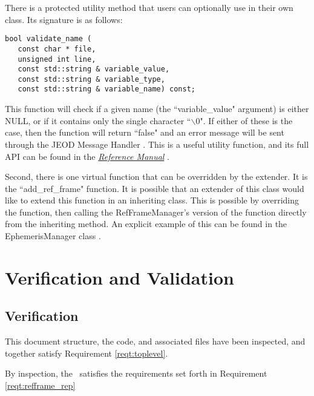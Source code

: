There is a protected utility method that users can optionally use in their own
class. Its signature is as follows:

\begin{verbatim}
bool validate_name (
   const char * file,
   unsigned int line,
   const std::string & variable_value,
   const std::string & variable_type,
   const std::string & variable_name) const;
\end{verbatim}

This function will check if a given name (the ``variable\_value" argument) is either NULL, or
if it contains only the single character ``$\backslash$0". If either of these is the case, then the function
will return ``false" and an error message will be sent through the
JEOD Message Handler \cite{dynenv:MESSAGE}. This is a useful utility function, and its full API
can be found in the \href{file:refman.pdf} {\em Reference Manual}
\cite{refframesbib:ReferenceManual}.

Second, there is one virtual function that can be overridden by the extender. It is the
``add\_ref\_frame" function. It is possible that an extender of this class would like
to extend this function in an inheriting class. This is possible by overriding the function,
then calling the RefFrameManager's version of the function directly from the inheriting method.
An explicit example of this can be found in the EphemerisManager class \cite{dynenv:EPHEMERIDES}.


\chapter{Verification and Validation}\label{ch:ivv}

\section{Verification}
\label{inspect:TLI}
 This document structure, the code, and associated files have been inspected, and together satisfy Requirement \ref{reqt:toplevel}.

\label{inspect:refframe_representation}

By inspection, the \ satisfies the requirements set forth
in Requirement \ref{reqt:refframe_rep}

